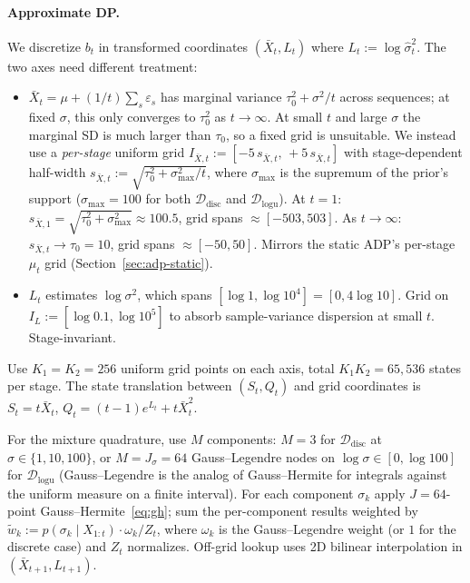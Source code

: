 \documentclass[11pt]{article}
\begin{document}
\paragraph{Approximate DP.}
\label{sec:adp-random}
We discretize $b_t$ in transformed coordinates $(\bar X_t, L_t)$ where $L_t := \log\hat\sigma_t^2$. The two axes need different treatment:
\begin{itemize}
\item $\bar X_t = \mu + (1/t)\sum_s \varepsilon_s$ has marginal variance $\tau_0^2 + \sigma^2/t$ across sequences; at fixed $\sigma$, this only converges to $\tau_0^2$ as $t \to \infty$. At small $t$ and large $\sigma$ the marginal SD is much larger than $\tau_0$, so a fixed grid is unsuitable. We instead use a \emph{per-stage} uniform grid $I_{\bar X, t} := [-5\, s_{\bar X, t},\, +5\, s_{\bar X, t}]$ with stage-dependent half-width $s_{\bar X, t} := \sqrt{\tau_0^2 + \sigma_{\max}^2 / t}$, where $\sigma_{\max}$ is the supremum of the prior's support ($\sigma_{\max} = 100$ for both $\mathcal{D}_{\mathrm{disc}}$ and $\mathcal{D}_{\mathrm{logu}}$). At $t = 1$: $s_{\bar X, 1} = \sqrt{\tau_0^2 + \sigma_{\max}^2} \approx 100.5$, grid spans $\approx [-503, 503]$. As $t \to \infty$: $s_{\bar X, t} \to \tau_0 = 10$, grid spans $\approx [-50, 50]$. Mirrors the static ADP's per-stage $\mu_t$ grid (Section~\ref{sec:adp-static}).
\item $L_t$ estimates $\log\sigma^2$, which spans $[\log 1, \log 10^4] = [0, 4\log 10]$. Grid on $I_L := [\log 0.1, \log 10^5]$ to absorb sample-variance dispersion at small $t$. Stage-invariant.
\end{itemize}
Use $K_1 = K_2 = 256$ uniform grid points on each axis, total $K_1 K_2 = 65{,}536$ states per stage. The state translation between $(S_t, Q_t)$ and grid coordinates is $S_t = t \bar X_t$, $Q_t = (t-1) e^{L_t} + t \bar X_t^2$.

For the mixture quadrature, use $M$ components: $M = 3$ for $\mathcal{D}_{\mathrm{disc}}$ at $\sigma \in \{1, 10, 100\}$, or $M = J_\sigma = 64$ Gauss--Legendre nodes on $\log\sigma \in [0, \log 100]$ for $\mathcal{D}_{\mathrm{logu}}$ (Gauss--Legendre is the analog of Gauss--Hermite for integrals against the uniform measure on a finite interval). For each component $\sigma_k$ apply $J = 64$-point Gauss--Hermite~\eqref{eq:gh}; sum the per-component results weighted by $\tilde w_k := p(\sigma_k \mid X_{1:t}) \cdot \omega_k / Z_t$, where $\omega_k$ is the Gauss--Legendre weight (or $1$ for the discrete case) and $Z_t$ normalizes. Off-grid lookup uses 2D bilinear interpolation in $(\bar X_{t+1}, L_{t+1})$.
\end{document}
